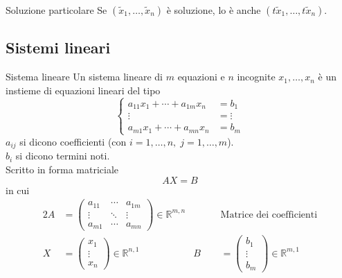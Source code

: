 \begin{SubDef}{Soluzione particolare}\label{def:lineare_equazione_soluzione_particolare_2}
  Se $(\tilde{x}_1,\ldots,\tilde{x}_n)$ è soluzione, lo è anche
  $(t\tilde{x}_1,\ldots,t\tilde{x}_n)$.
\end{SubDef}

\subsection{Sistemi lineari}%
\label{sub:sistemi_lineari}

\begin{Def}{Sistema lineare}
  Un sistema lineare di $m$ equazioni e $n$ incognite $x_1,\ldots,x_n$ è un instieme di
  equazioni lineari del tipo
  \begin{equation}\label{eq:lineare_sistema}
    \begin{cases}
      a_{11}x_1+\cdots+a_{1m}x_n &= b_1\\
      \vdots &= \vdots\\
      a_{m1}x_1+\cdots+a_{mn}x_n &= b_m
    \end{cases}
  \end{equation}
  $a_{ij}$ si dicono coefficienti (con $i=1,\ldots,n,\;j=1,\ldots,m$).\\
  $b_{i}$ si dicono termini noti.\\
  Scritto in forma matriciale
  \begin{equation*}
    AX=B
  \end{equation*}
  in cui
  \begin{alignat*}{2}
    A &=
    \begin{pmatrix}
      a_{11} & \cdots & a_{1m}\\
      \vdots & \ddots & \vdots\\
      a_{m1} & \cdots & a_{mn}
    \end{pmatrix}\in\mathbb{R}^{m,n} &\qquad &\text{Matrice dei coefficienti}\\
    X &=
    \begin{pmatrix}
      x_1\\\vdots\\x_n
    \end{pmatrix}\in\mathbb{R}^{n,1} & B &=
    \begin{pmatrix}
      b_1\\\vdots\\b_m
    \end{pmatrix}\in\mathbb{R}^{m,1}
  \end{alignat*}
\end{Def}

